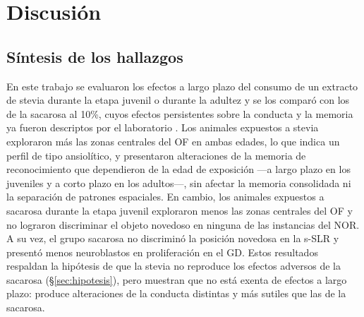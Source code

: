 \chapter{Discusión}\label{cap:discusion}

\section{Síntesis de los hallazgos}\label{sec:disc-sintesis}

En este trabajo se evaluaron los efectos a largo plazo del consumo de un extracto de stevia durante la etapa juvenil o durante la adultez y se los comparó con los de la sacarosa al 10\%, cuyos efectos persistentes sobre la conducta y la memoria ya fueron descriptos por el laboratorio \cite{kruse2019sucrose,coirini2022sucrose}. Los animales expuestos a stevia exploraron más las zonas centrales del OF en ambas edades, lo que indica un perfil de tipo ansiolítico, y presentaron alteraciones de la memoria de reconocimiento que dependieron de la edad de exposición ---a largo plazo en los juveniles y a corto plazo en los adultos---, sin afectar la memoria consolidada ni la separación de patrones espaciales. En cambio, los animales expuestos a sacarosa durante la etapa juvenil exploraron menos las zonas centrales del OF y no lograron discriminar el objeto novedoso en ninguna de las instancias del NOR. A su vez, el grupo sacarosa no discriminó la posición novedosa en la s-SLR y presentó menos neuroblastos en proliferación en el GD. Estos resultados respaldan la hipótesis de que la stevia no reproduce los efectos adversos de la sacarosa (\S\ref{sec:hipotesis}), pero muestran que no está exenta de efectos a largo plazo: produce alteraciones de la conducta distintas y más sutiles que las de la sacarosa.

